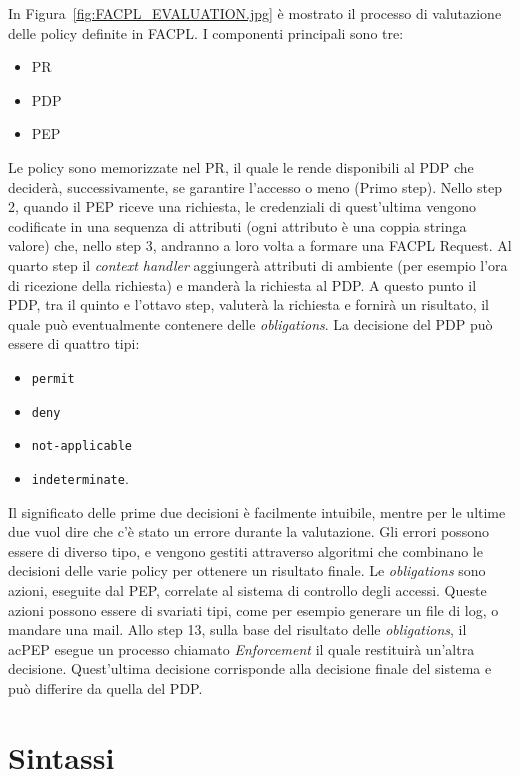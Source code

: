 In Figura~\ref{fig:FACPL_EVALUATION.jpg} è mostrato il processo di valutazione delle policy definite in FACPL.
I componenti principali sono tre:
\begin{itemize}
\item{\acf{PR}}
\item{\acf{PDP}}
\item{\acf{PEP}}
\end{itemize}
Le policy sono memorizzate nel \ac{PR}, il quale le rende disponibili al \ac{PDP} che deciderà, successivamente, se garantire l'accesso o meno (Primo step).
Nello step 2, quando il \ac{PEP} riceve una richiesta, le credenziali di quest'ultima vengono codificate in una sequenza di attributi (ogni attributo è una coppia stringa valore) che, nello step 3, andranno a loro volta a formare una \ac{FACPL} Request.
Al quarto step il \textit{context handler} aggiungerà attributi di ambiente (per esempio l'ora di ricezione della richiesta) e manderà la richiesta al \ac{PDP}.
A questo punto il \ac{PDP}, tra il quinto e l'ottavo step, valuterà la richiesta e fornirà un risultato, il quale può eventualmente contenere delle \textit{obligations}.
La decisione del \ac{PDP} può essere di quattro tipi:
\begin{itemize}
\item \texttt{permit}
\item \texttt{deny}
\item \texttt{not-applicable} 
\item \texttt{indeterminate}.
\end{itemize}
Il significato delle prime due decisioni è facilmente intuibile, mentre per le ultime due vuol dire che c'è stato un errore durante la valutazione.
Gli errori possono essere di diverso tipo, e vengono gestiti attraverso algoritmi che combinano le decisioni delle varie policy per ottenere un risultato finale.
Le \textit{obligations} sono azioni, eseguite dal \ac{PEP}, correlate al sistema di controllo degli accessi. Queste azioni possono essere di svariati tipi, come per esempio generare un file di log, o mandare una mail.
Allo step 13, sulla base del risultato delle \textit{obligations}, il ac{PEP} esegue un processo chiamato \textit{Enforcement} il quale restituirà un'altra decisione.
Quest'ultima decisione corrisponde alla decisione finale del sistema e può differire da quella del PDP.


\section{Sintassi}
\label{sec:facpl_syntax}

